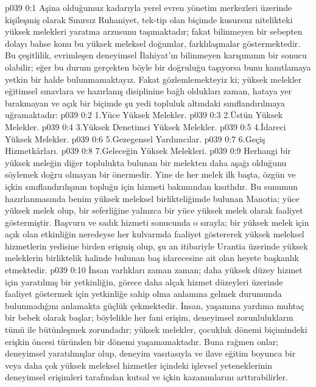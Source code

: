 \vs p039 0:1 Aşina olduğumuz kadarıyla yerel evren yönetim merkezleri üzerinde kişileşmiş olarak Sınırsız Ruhaniyet, tek\hyp{}tip olan biçimde kusursuz nitelikteki yüksek melekleri yaratma arzusunu taşımaktadır; fakat bilinmeyen bir sebepten dolayı bahse konu bu yüksek meleksel doğumlar, farklılaşmalar göstermektedir. Bu çeşitlilik, evrimleşen deneyimsel İlahiyat’ın bilinmeyen karışımının bir sonucu olabilir; eğer bu durum gerçekten böyle bir doğruluğu taşıyorsa bunu kanıtlamaya yetkin bir halde bulunmamaktayız. Fakat gözlemlemekteyiz ki; yüksek melekler eğitimsel sınavlara ve hazırlanış disiplinine bağlı oldukları zaman, hataya yer bırakmayan ve açık bir biçimde şu yedi topluluk altındaki sınıflandırılmaya uğramaktadır:
\vs p039 0:2 1.\bibnobreakspace Yüce Yüksek Melekler.
\vs p039 0:3 2.\bibnobreakspace Üstün Yüksek Melekler.
\vs p039 0:4 3.\bibnobreakspace Yüksek Denetimci Yüksek Melekler.
\vs p039 0:5 4.\bibnobreakspace İdareci Yüksek Melekler.
\vs p039 0:6 5.\bibnobreakspace Gezegensel Yardımcılar.
\vs p039 0:7 6.\bibnobreakspace Geçiş Hizmetkârları.
\vs p039 0:8 7.\bibnobreakspace Geleceğin Yüksek Melekleri.
\vs p039 0:9 Herhangi bir yüksek meleğin diğer toplulukta bulunan bir melekten daha aşağı olduğunu söylemek doğru olmayan bir önermedir. Yine de her melek ilk başta, özgün ve içkin sınıflandırılışının topluğu için hizmeti bakımından kısıtlıdır. Bu sunumun hazırlanmasında benim yüksek meleksel birlikteliğimde bulunan Manotia; yüce yüksek melek olup, bir seferliğine yalnızca bir yüce yüksek melek olarak faaliyet göstermiştir. Başvuru ve sadık hizmeti sonucunda o sırayla; bir yüksek melek için açık olan etkinliğin neredeyse her kulvarında faaliyet göstererek yüksek meleksel hizmetlerin yedisine birden erişmiş olup, şu an itibariyle Urantia üzerinde yüksek meleklerin birliktelik halinde bulunan baş idarecesine ait olan heyete başkanlık etmektedir.
\vs p039 0:10 İnsan varlıkları zaman zaman; daha yüksek düzey hizmet için yaratılmış bir yetkinliğin, görece daha alçak hizmet düzeyleri üzerinde faaliyet göstermek için yetkinliğe sahip olma anlamına gelmek durumunda bulunmadığını anlamakta güçlük çekmektedir. İnsan, yaşamına yardıma muhtaç bir bebek olarak başlar; böylelikle her fani erişim, deneyimsel zorunlulukların tümü ile bütünleşmek zorundadır; yüksek melekler, çocukluk dönemi biçimindeki erişkin öncesi türünden bir dönemi yaşamamaktadır. Buna rağmen onlar; deneyimsel yaratılmışlar olup, deneyim vasıtasıyla ve ilave eğitim boyunca bir veya daha çok yüksek meleksel hizmetler içindeki işlevsel yeteneklerinin deneyimsel erişimleri tarafından kutsal ve içkin kazanımlarını arttırabilirler.
